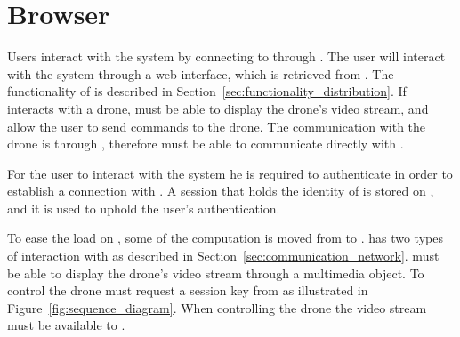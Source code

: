 \section{Browser}
\label{sec:design_client}
Users interact with the system by connecting to  through .
The user will interact with the system through a web interface, which is retrieved from .
The functionality of  is described in Section~\ref{sec:functionality_distribution}.
If  interacts with a drone,  must be able to display the drone's video stream, and allow the user to send commands to the drone.
The communication with the drone is through , therefore  must be able to communicate directly with .

For the user to interact with the system he is required to authenticate in order to establish a connection with . %
A session that holds the identity of  is stored on , and it is used to uphold the user's authentication. %

To ease the load on , some of the computation is moved from  to .
 has two types of interaction with  as described in Section~\ref{sec:communication_network}.
 must be able to display the drone's video stream through a multimedia object.
To control the drone  must request a session key from  as illustrated in Figure~\ref{fig:sequence_diagram}.
When controlling the drone the video stream must be available to .

